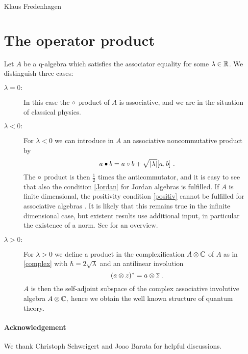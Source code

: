 \begin{artengenv}{Klaus Fredenhagen}
\section{The operator product}
Let $A$ be a q-algebra which satisfies the associator equality for some $\lambda\in\mathbb{R}$. We distinguish three cases:
\begin{description}
\item[{$\lambda=0:$}]
In this case the $\circ$-product of $A$ is associative, and we are in the situation of classical physics.
\item[{$\lambda<0:$}]
For $\lambda<0$ we can introduce in $A$ an associative noncommutative product by
\[a\bullet b=a\c b+\sqrt{|\lambda|}[a,b]\ .\]
The $\circ$ product is then $\frac12$ times the anticommutator, and it is easy to see that also the condition \eqref{Jordan} for Jordan algebras is fulfilled. If $A$ is finite dimensional, the positivity condition \eqref{positiv} cannot be fulfilled for associative algebras \parencite{Braun}. It is likely that this remains true in the infinite dimensional case, but existent results use additional input, in particular the existence of a norm. See \parencite{Mc} for an overview.  
 
\item[{$\lambda>0:$}]
For $\lambda >0$ we define a product in the complexification $A\otimes \mathbb{C}$ of $A$ as in \eqref{complex} with $\hbar=2\sqrt{\lambda}$ and an antilinear involution
\[(a\otimes z)^*=a\otimes\overline{z}\ .\]
$A$ is then the self-adjoint subspace of the complex associative  involutive algebra $A\otimes\mathbb{C}$, hence we obtain the well known structure of quantum theory.
\end{description}


\paragraph{Acknowledgement}
We thank Christoph Schweigert and Joao Barata for helpful discussions.






\end{artengenv}